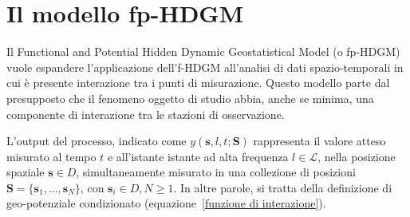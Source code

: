 \section[Il modello fp-HDGM]{Il modello fp-HDGM}
Il Functional and Potential Hidden Dynamic Geostatistical Model (o fp-HDGM) vuole espandere l'applicazione dell'f-HDGM all'analisi di dati spazio-temporali in cui è presente interazione tra i punti di misurazione. Questo modello parte dal presupposto che il fenomeno oggetto di studio abbia, anche se minima, una componente di interazione tra le stazioni di osservazione.
\par L'output del processo, indicato come $y(\mathbf{s}, l, t; \mathbf{S})$ rappresenta il valore atteso misurato al tempo $t$ e all'istante istante ad alta frequenza $l\in\mathcal{L}$, nella posizione spaziale $\mathbf{s} \in D$, simultaneamente misurato in una collezione di posizioni $\mathbf{S} = \{\mathbf{s}_1, \ldots, \mathbf{s}_N\}$, con $\mathbf{s}_i\in D, N \geq 1$. In altre parole, si tratta della definizione di geo-potenziale condizionato (equazione~\ref{funzione di interazione}).

